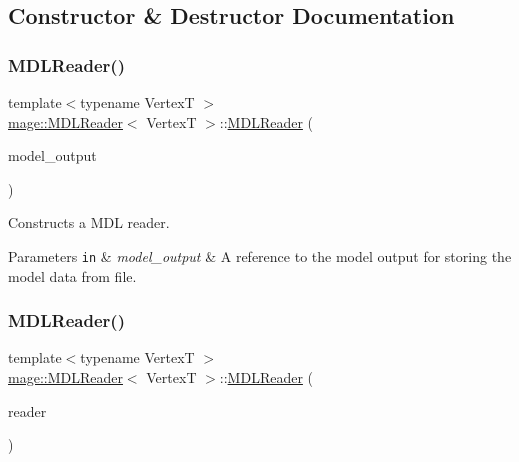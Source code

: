 \subsection{Constructor \& Destructor Documentation}
\hypertarget{classmage_1_1_m_d_l_reader_a068ed8c9101b42033ea166ab7aa03c04}{}\label{classmage_1_1_m_d_l_reader_a068ed8c9101b42033ea166ab7aa03c04} 
\subsubsection{\texorpdfstring{M\+D\+L\+Reader()}{MDLReader()}\hspace{0.1cm}{\footnotesize\ttfamily [1/3]}}
{\footnotesize\ttfamily template$<$typename VertexT $>$ \\
\hyperlink{classmage_1_1_m_d_l_reader}{mage\+::\+M\+D\+L\+Reader}$<$ VertexT $>$\+::\hyperlink{classmage_1_1_m_d_l_reader}{M\+D\+L\+Reader} (\begin{DoxyParamCaption}\item[{\hyperlink{structmage_1_1_model_output}{Model\+Output}$<$ VertexT $>$ \&}]{model\+\_\+output }\end{DoxyParamCaption})\hspace{0.3cm}{\ttfamily [explicit]}}

Constructs a M\+DL reader.


\begin{DoxyParams}[1]{Parameters}
\mbox{\tt in}  & {\em model\+\_\+output} & A reference to the model output for storing the model data from file. \\
\hline
\end{DoxyParams}
\hypertarget{classmage_1_1_m_d_l_reader_aaabae8c4e8632423f1af18a6d99345db}{}\label{classmage_1_1_m_d_l_reader_aaabae8c4e8632423f1af18a6d99345db} 
\subsubsection{\texorpdfstring{M\+D\+L\+Reader()}{MDLReader()}\hspace{0.1cm}{\footnotesize\ttfamily [2/3]}}
{\footnotesize\ttfamily template$<$typename VertexT $>$ \\
\hyperlink{classmage_1_1_m_d_l_reader}{mage\+::\+M\+D\+L\+Reader}$<$ VertexT $>$\+::\hyperlink{classmage_1_1_m_d_l_reader}{M\+D\+L\+Reader} (\begin{DoxyParamCaption}\item[{const \hyperlink{classmage_1_1_m_d_l_reader}{M\+D\+L\+Reader}$<$ VertexT $>$ \&}]{reader }\end{DoxyParamCaption})\hspace{0.3cm}{\ttfamily [delete]}}

